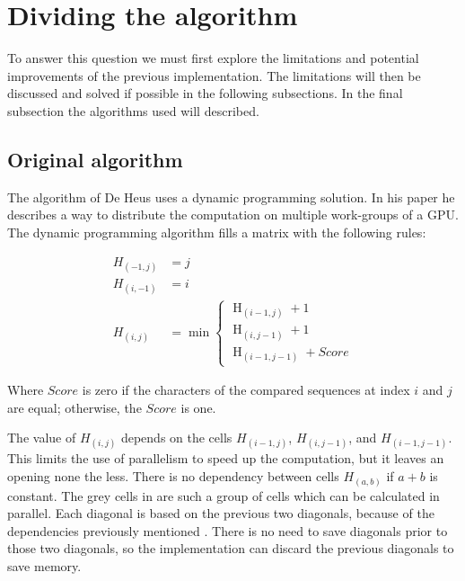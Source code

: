 \section{Dividing the algorithm} \label{q1}
To answer this question we must first explore the limitations and potential improvements of the previous implementation.
The limitations will then be discussed and solved if possible in the following subsections.
In the final subsection the algorithms used will described.

\subsection{Original algorithm} \label{originalalg}
The algorithm of De Heus uses a dynamic programming solution\cite{Heus}.
In his paper he describes a way to distribute the computation on multiple work-groups of a GPU.
The dynamic programming algorithm fills a matrix with the following rules\cite{Jordan}:

\begin{equation} \label{eq1}
\begin{split}
H_{(-1,j)} & = j \\
H_{(i,-1)} & = i \\
H_{(i,j)} & = \min \begin{cases}
          \operatorname{H}_{(i-1,j)} + 1 \\
          \operatorname{H}_{(i,j-1)} + 1 \\
          \operatorname{H}_{(i-1,j-1)} + Score
\end{cases}
\end{split}
\end{equation}

Where $Score$ is zero if the characters of the compared sequences at index $i$ and $j$ are equal; otherwise, the $Score$ is one.

The value of $H_{(i,j)}$ depends on the cells $H_{(i-1,j)}$, $H_{(i,j-1)}$, and $H_{(i-1,j-1)}$.
This limits the use of parallelism to speed up the computation, but it leaves an opening none the less.
There is no dependency between cells $H_{(a,b)}$ if $a + b$ is constant.
The grey cells in  are such a group of cells which can be calculated in parallel.
Each diagonal is based on the previous two diagonals, because of the dependencies previously mentioned \cite{Meyers}.
There is no need to save diagonals prior to those two diagonals, so the implementation can discard the previous diagonals to save memory.

